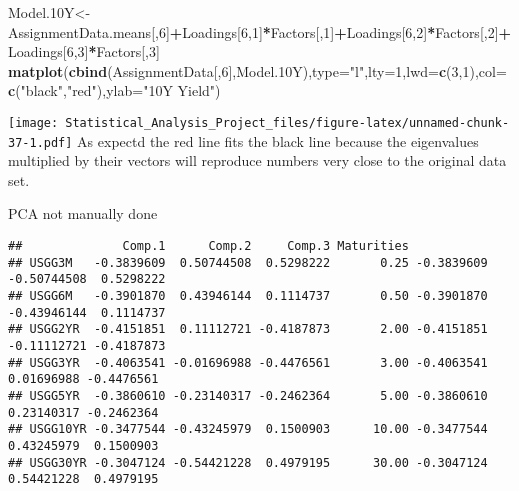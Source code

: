 \documentclass[]{article}
\newenvironment{Shaded}{\begin{snugshade}}{\end{snugshade}}
\newcommand{\KeywordTok}[1]{\textcolor[rgb]{0.13,0.29,0.53}{\textbf{#1}}}
\newcommand{\DataTypeTok}[1]{\textcolor[rgb]{0.13,0.29,0.53}{#1}}
\newcommand{\DecValTok}[1]{\textcolor[rgb]{0.00,0.00,0.81}{#1}}
\newcommand{\StringTok}[1]{\textcolor[rgb]{0.31,0.60,0.02}{#1}}
\newcommand{\OperatorTok}[1]{\textcolor[rgb]{0.81,0.36,0.00}{\textbf{#1}}}
\newcommand{\NormalTok}[1]{#1}
\begin{document}
\begin{Shaded}
\begin{Highlighting}[]
\NormalTok{Model.10Y<-AssignmentData.means[,}\DecValTok{6}\NormalTok{]}\OperatorTok{+}\NormalTok{Loadings[}\DecValTok{6}\NormalTok{,}\DecValTok{1}\NormalTok{]}\OperatorTok{*}\NormalTok{Factors[,}\DecValTok{1}\NormalTok{]}\OperatorTok{+}\NormalTok{Loadings[}\DecValTok{6}\NormalTok{,}\DecValTok{2}\NormalTok{]}\OperatorTok{*}\NormalTok{Factors[,}\DecValTok{2}\NormalTok{]}\OperatorTok{+}\NormalTok{Loadings[}\DecValTok{6}\NormalTok{,}\DecValTok{3}\NormalTok{]}\OperatorTok{*}\NormalTok{Factors[,}\DecValTok{3}\NormalTok{]}
\KeywordTok{matplot}\NormalTok{(}\KeywordTok{cbind}\NormalTok{(AssignmentData[,}\DecValTok{6}\NormalTok{],Model.10Y),}\DataTypeTok{type=}\StringTok{"l"}\NormalTok{,}\DataTypeTok{lty=}\DecValTok{1}\NormalTok{,}\DataTypeTok{lwd=}\KeywordTok{c}\NormalTok{(}\DecValTok{3}\NormalTok{,}\DecValTok{1}\NormalTok{),}\DataTypeTok{col=}\KeywordTok{c}\NormalTok{(}\StringTok{"black"}\NormalTok{,}\StringTok{"red"}\NormalTok{),}\DataTypeTok{ylab=}\StringTok{"10Y Yield"}\NormalTok{)}
\end{Highlighting}
\end{Shaded}

\texttt{[image: Statistical\_Analysis\_Project\_files/figure-latex/unnamed-chunk-37-1.pdf]}
As expectd the red line fits the black line because the eigenvalues
multiplied by their vectors will reproduce numbers very close to the
original data set.

PCA not manually done

\begin{Shaded}
\end{Shaded}

\begin{verbatim}
##              Comp.1      Comp.2     Comp.3 Maturities                                  
## USGG3M   -0.3839609  0.50744508  0.5298222       0.25 -0.3839609 -0.50744508  0.5298222
## USGG6M   -0.3901870  0.43946144  0.1114737       0.50 -0.3901870 -0.43946144  0.1114737
## USGG2YR  -0.4151851  0.11112721 -0.4187873       2.00 -0.4151851 -0.11112721 -0.4187873
## USGG3YR  -0.4063541 -0.01696988 -0.4476561       3.00 -0.4063541  0.01696988 -0.4476561
## USGG5YR  -0.3860610 -0.23140317 -0.2462364       5.00 -0.3860610  0.23140317 -0.2462364
## USGG10YR -0.3477544 -0.43245979  0.1500903      10.00 -0.3477544  0.43245979  0.1500903
## USGG30YR -0.3047124 -0.54421228  0.4979195      30.00 -0.3047124  0.54421228  0.4979195
\end{verbatim}
\end{document}
